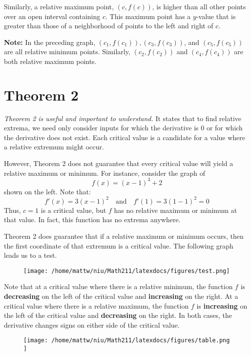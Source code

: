 \documentclass{report}
\begin{document}
Similarly, a relative maximum point, \( (c, f(c)) \), is higher than all other points over an open interval containing \( c \). This maximum point has a \( y \)-value that is greater than those of a neighborhood of points to the left and right of \( c \).

\textbf{Note:} In the preceding graph, \( (c_1, f(c_1)), (c_3, f(c_3)) \), and \( (c_5, f(c_5)) \) are all relative minimum points. Similarly, \( (c_2, f(c_2)) \) and \( (c_4, f(c_4)) \) are both relative maximum points.

\section*{Theorem 2}

\textit{Theorem 2 is useful and important to understand.} It states that to find relative extrema, we need only consider inputs for which the derivative is 0 or for which the derivative does not exist. Each critical value is a candidate for a value where a relative extremum might occur.

However, Theorem 2 does not guarantee that every critical value will yield a relative maximum or minimum. For instance, consider the graph of
\[
f(x) = (x-1)^3 + 2
\]
shown on the left. Note that:
\[
f'(x) = 3(x-1)^2 \quad \text{and} \quad f'(1) = 3(1-1)^2 = 0
\]
Thus, \( c = 1 \) is a critical value, but \( f \) has no relative maximum or minimum at that value. In fact, this function has no extrema anywhere.
\vspace{2mm}

\noindent Theorem 2 does guarantee that if a relative maximum or minimum occurs, then the first coordinate of that extremum is a critical value.
\bigbreak \noindent
The following graph leads us to a test.
\begin{figure}[ht]
\centering
\texttt{[image:  /home/mattw/niu/Math211/latexdocs/figures/test.png]}
\end{figure}

\pagebreak
\begin{mdframed}
  \vspace{1.5mm}

Note that at a critical value where there is a relative minimum, the function $f$ is \textbf{decreasing} on the left of the critical value and \textbf{increasing} on the right.
\bigbreak \noindent
At a critical value where there is a relative maximum, the function $f$ is \textbf{increasing} on the left of the critical value and \textbf{decreasing} on the right. In both cases, the derivative changes signs on either side of the critical value.
\vspace{1.5mm}
\end{mdframed}
\bigbreak \noindent \bigbreak \noindent \bigbreak \noindent \bigbreak \noindent 
\begin{figure}[ht]
\centering
\texttt{[image:  /home/mattw/niu/Math211/latexdocs/figures/table.png ]}
\end{figure}
\end{document}
